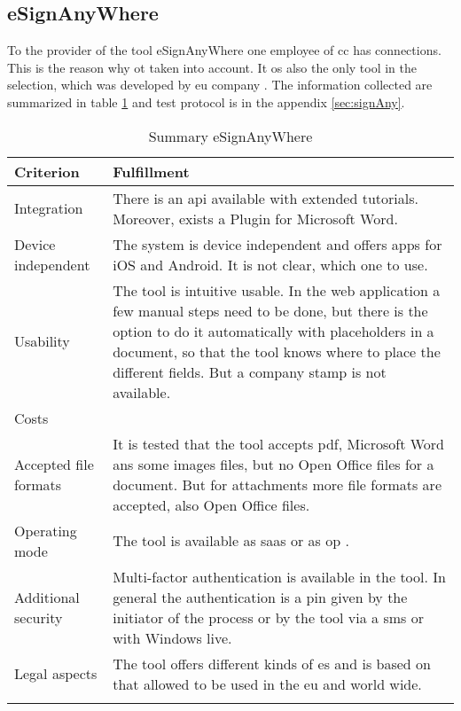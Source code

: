 \subsection{eSignAnyWhere}
To the provider of the tool eSignAnyWhere one employee of \gls{cc} has connections. This is the reason why ot taken into account. It os also the only tool in the selection, which was developed by \gls{eu} company \parencite{signAny2018contact}. The information collected are summarized in table \ref{tab:esignany} and test protocol is in the appendix \ref{sec:signAny}.
	\begin{longtable}{|p{4cm}|p{10cm}|} \hline
		Criterion & Fulfillment \\ \hline
		Integration & There is an \gls{api} available with extended tutorials. Moreover, exists a Plugin for Microsoft Word. \parencite{signAny2018api, signAny2018dev,signAny2018guide} \\ \hline
		Device independent & The system is device independent and offers \glspl{app} for iOS and Android. It is not clear, which one to use. \parencite{signAny2018info} \\ \hline
		Usability & The tool is intuitive usable. In the web application a few manual steps need to be done, but there is the option to do it automatically with placeholders in a document, so that the tool knows where to place the different fields. But a company stamp is not available. \parencite{signAny2018guide} \\ \hline
		Costs & \\ \hline
		Accepted file formats & It is tested that the tool accepts \gls{pdf}, Microsoft Word ans some images files, but no Open Office files for a document. But for attachments more file formats are accepted, also Open Office files. \\ \hline
		Operating mode &  The tool is available as \gls{saas} or as \gls{op} \parencite{signAny2018business}. \\ \hline
		Additional security & Multi-factor authentication is available in the tool. In general the authentication is a pin given by the initiator of the process or by the tool via a sms or with Windows live. \parencite{signAny2018sign} \\ \hline
		Legal aspects & The tool offers different kinds of \gls{es} and is based on that allowed to be used in the \gls{eu} and world wide. \parencite{signAny2018sign} \\ \hline
	\caption{Summary eSignAnyWhere}
	\label{tab:esignany}
	\end{longtable}


